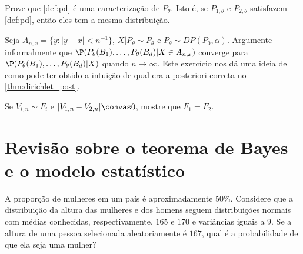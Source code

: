 \begin{exercise}
 Prove que \cref{def:pd} é
 uma caracterização de $P_{\theta}$.
 Isto é, se $P_{1,\theta}$ e
 $P_{2,\theta}$ satisfazem \cref{def:pd},
 então eles tem a mesma distribuição.
\end{exercise}

\begin{exercise}
 Seja $A_{n,x} = \{y: |y-x| < n^{-1}\}$,
 $X|P_{\theta} \sim P_{\theta}$ e
 $P_{\theta} \sim DP(P_0, \alpha)$.
 Argumente informalmente que
 $\P(P_{\theta}(B_1),\ldots,P_{\theta}(B_d)|X \in A_{n,x})$
 converge para $\P(P_{\theta}(B_1),\ldots,P_{\theta}(B_d)|X)$
 quando $n \rightarrow \infty$.
 Este exercício nos dá uma ideia de como 
 \citep{Ferguson1973} pode ter obtido 
 a intuição de qual era a posteriori correta no
 \cref{thm:dirichlet_post}.
\end{exercise}

\begin{exercise}
 Se $V_{i,n} \sim F_{i}$ e
 $|V_{1,n}-V_{2,n}| \convas 0$, 
 mostre que $F_1 = F_2$.
\end{exercise}


\section{Revisão sobre o teorema de Bayes e
o modelo estatístico}

\begin{exercise}
 \label{ex:normal-mixture}
 A proporção de mulheres em um país é
 aproximadamente 50\%. Considere que
 a distribuição da altura das mulheres e
 dos homens seguem distribuições normais com
 médias conhecidas, respectivamente, $165$ e $170$ e
 variâncias iguais a $9$.
 Se a altura de uma pessoa selecionada
 aleatoriamente é $167$, qual é a
 probabilidade de que ela seja uma mulher?
\end{exercise}

